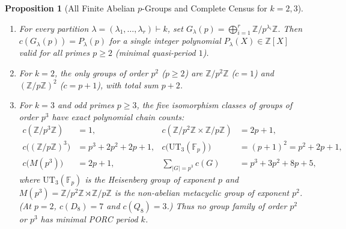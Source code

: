 \documentclass[11pt,a4paper]{article}
\newtheorem{proposition}[theorem]{Proposition}
\theoremstyle{definition}
\newcommand{\UT}{\mathrm{UT}}
\newcommand{\Fp}{\mathbb{F}_p}
\begin{document}
\begin{proposition}[All Finite Abelian $p$-Groups and Complete Census for $k = 2, 3$]\label{prop:abelian-and-p3}
\begin{enumerate}
  \item For every partition $\lambda = (\lambda_1, \dots, \lambda_r) \vdash k$, set $G_\lambda(p) = \bigoplus_{i=1}^r \mathbb{Z}/p^{\lambda_i}\mathbb{Z}$. Then $c(G_\lambda(p)) = P_\lambda(p)$ for a single integer polynomial $P_\lambda(X) \in \mathbb{Z}[X]$ valid for \emph{all} primes $p \ge 2$ (minimal quasi-period $1$).
  \item For $k = 2$, the only groups of order $p^2$ ($p \ge 2$) are $\mathbb{Z}/p^2\mathbb{Z}$ ($c = 1$) and $(\mathbb{Z}/p\mathbb{Z})^2$ ($c = p + 1$), with total sum $p + 2$.
  \item For $k = 3$ and odd primes $p \ge 3$, the five isomorphism classes of groups of order $p^3$ have exact polynomial chain counts:
  \begin{align*}
    c(\mathbb{Z}/p^3\mathbb{Z}) &= 1, &
    c(\mathbb{Z}/p^2\mathbb{Z} \times \mathbb{Z}/p\mathbb{Z}) &= 2p + 1, \\
    c\bigl((\mathbb{Z}/p\mathbb{Z})^3\bigr) &= p^3 + 2p^2 + 2p + 1, &
    c\bigl(\UT_3(\Fp)\bigr) &= (p + 1)^2 = p^2 + 2p + 1, \\
    c\bigl(M(p^3)\bigr) &= 2p + 1, &
    \sum_{|G|=p^3} c(G) &= p^3 + 3p^2 + 8p + 5,
  \end{align*}
  where $\UT_3(\Fp)$ is the Heisenberg group of exponent $p$ and $M(p^3) = \mathbb{Z}/p^2\mathbb{Z} \rtimes \mathbb{Z}/p\mathbb{Z}$ is the non-abelian metacyclic group of exponent $p^2$. (At $p = 2$, $c(D_8) = 7$ and $c(Q_8) = 3$.) Thus \emph{no} group family of order $p^2$ or $p^3$ has minimal PORC period $k$.
\end{enumerate}
\end{proposition}
\end{document}
